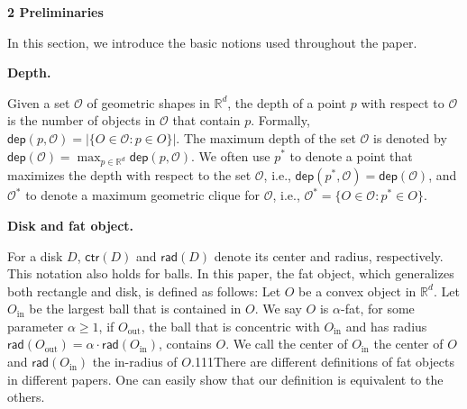 \documentclass[10pt,a4paper]{article}
\begin{document}
\par\medskip\noindent\textbf{2 Preliminaries}\par
In this section, we introduce the basic notions used throughout the paper.
\par
\par
\par\medskip\noindent\textbf{Depth.}\par
Given a set $\mathcal{O}$ of geometric shapes in $\mathbb{R}^{d}$, the depth of a point $p$ with respect to $\mathcal{O}$ is the number of objects in $\mathcal{O}$ that contain $p$. Formally, ${\mathsf{dep}}(p,\mathcal{O})=|\{O\in\mathcal{O}:p\in O\}|$. The maximum depth of the set $\mathcal{O}$ is denoted by ${\mathsf{dep}}(\mathcal{O})=\max_{p\in\mathbb{R}^{d}}{\mathsf{dep}}(p,\mathcal%
{O})$. We often use $p^{*}$ to denote a point that maximizes the depth with respect to the set $\mathcal{O}$, i.e., $\mathsf{dep}(p^{*},\mathcal{O})={\mathsf{dep}}(\mathcal{O})$, and $\mathcal{O}^{*}$ to denote a maximum geometric clique for $\mathcal{O}$, i.e., $\mathcal{O}^{*}=\{O\in\mathcal{O}:p^{*}\in O\}$.
\par
\par
\par\medskip\noindent\textbf{Disk and fat object.}\par
For a disk $D$, $\mathsf{ctr}(D)$ and $\mathsf{rad}(D)$ denote its center and radius, respectively. This notation also holds for balls. In this paper, the fat object, which generalizes both rectangle and disk, is defined as follows: Let $O$ be a convex object in $\mathbb{R}^{d}$. Let $O_{\mathrm{in}}$ be the largest ball that is contained in $O$. We say $O$ is $\alpha$-fat, for some parameter $\alpha\geq 1$, if $O_{\mathrm{out}}$, the ball that is concentric with $O_{\mathrm{in}}$ and has radius $\mathsf{rad}(O_{\mathrm{out}})=\alpha\cdot\mathsf{rad}(O_{\mathrm{in}})$, contains $O$. We call the center of $O_{\mathrm{in}}$ the center of $O$ and $\mathsf{rad}(O_{\mathrm{in}})$ the in-radius of $O$.111There are different definitions of fat objects in different papers. One can easily show that our definition is equivalent to the others.
\par
\par
\end{document}
